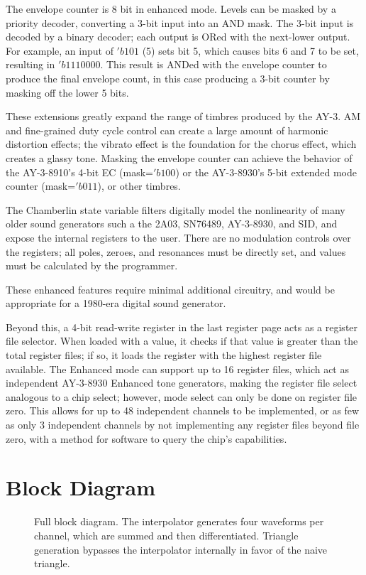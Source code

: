 The envelope counter is 8 bit in enhanced mode.  Levels can be masked by a priority decoder, converting a 3-bit input into an AND mask.  The 3-bit input is decoded by a binary decoder; each output is ORed with the next-lower output.  For example, an input of $'b101$ (5) sets bit 5, which causes bits 6 and 7 to be set, resulting in $'b1110000$.  This result is ANDed with the envelope counter to produce the final envelope count, in this case producing a 3-bit counter by masking off the lower 5 bits.

These extensions greatly expand the range of timbres produced by the AY-3.  AM and fine-grained duty cycle control can create a large amount of harmonic distortion effects; the vibrato effect is the foundation for the chorus effect, which creates a glassy tone.  Masking the envelope counter can achieve the behavior of the AY-3-8910's 4-bit EC (mask=$'b100$) or the AY-3-8930's 5-bit extended mode counter (mask=$'b011$), or other timbres.

The Chamberlin state variable filters digitally model the nonlinearity of many older sound generators such a the 2A03, SN76489, AY-3-8930, and SID, and expose the internal registers to the user.  There are no modulation controls over the registers; all poles, zeroes, and resonances must be directly set, and values must be calculated by the programmer.

These enhanced features require minimal additional circuitry, and would be appropriate for a 1980-era digital sound generator.

Beyond this, a 4-bit read-write register in the last register page acts as a register file selector.  When loaded with a value, it checks if that value is greater than the total register files; if so, it loads the register with the highest register file available.  The Enhanced mode can support up to 16 register files, which act as independent AY-3-8930 Enhanced tone generators, making the register file select analogous to a chip select; however, mode select can only be done on register file zero.  This allows for up to 48 independent channels to be implemented, or as few as only 3 independent channels by not implementing any register files beyond file zero, with a method for software to query the chip's capabilities.

\section{Block Diagram}

\begin{figure}[h!t]
    \centering
    
    \caption{\label{fig:block-diagram} Full block diagram.  The interpolator generates four waveforms per channel, which are summed and then differentiated.  Triangle generation bypasses the interpolator internally in favor of the naive triangle.}
\end{figure}

